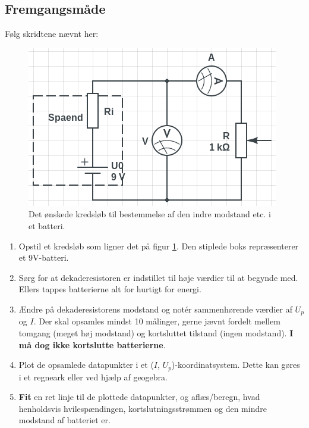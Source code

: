 \documentclass[a4paper, 12pt]{article}
\begin{document}
\subsection{Fremgangsmåde}
\label{sec:org178b549}

Følg skridtene nævnt her:

\begin{figure}[htbp]
\centering
\includegraphics[width=0.6\linewidth]{./img/forsoeg_3_3.png}
\caption{\label{forsoeg_3_3}Det ønskede kredsløb til bestemmelse af den indre modstand etc. i et batteri.}
\end{figure}

\begin{enumerate}[noitemsep]
\item Opstil et kredsløb som ligner det på figur \ref{forsoeg_3_3}. Den stiplede boks repræsenterer et 9V-batteri.
\item Sørg for at dekaderesistoren er indstillet til høje værdier til at begynde med. Ellers tappes batterierne alt for hurtigt for energi.
\item Ændre på dekaderesistorens modstand og notér sammenhørende værdier af \(U_p\) og \(I\). Der skal opsamles mindst 10 målinger, gerne jævnt fordelt mellem tomgang (meget høj modstand) og kortsluttet tilstand (ingen modstand). \textbf{\textbf{I må dog ikke kortslutte batterierne}}.
\item Plot de opsamlede datapunkter i et (\(I\), \(U_p\))-koordinatsystem. Dette kan gøres i et regneark eller ved hjælp af geogebra.
\item \textbf{Fit} en ret linje til de plottede datapunkter, og aflæs/beregn, hvad henholdsvis hvilespændingen, kortslutningsstrømmen og den mindre modstand af batteriet er.
\end{enumerate}
\end{document}
